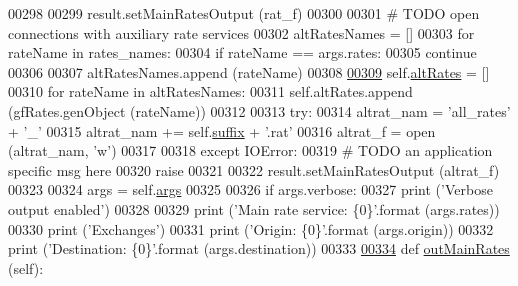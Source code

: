 \begin{DoxyCode}
{00298 
00299         result.setMainRatesOutput (rat\_f)
00300             
00301         \textcolor{comment}{# TODO open connections with auxiliary rate services}
00302         altRatesNames = []        
00303         \textcolor{keywordflow}{for} rateName \textcolor{keywordflow}{in} rates\_names:
00304             \textcolor{keywordflow}{if} rateName == args.rates:
00305                 \textcolor{keywordflow}{continue} 
00306             
00307             altRatesNames.append (rateName)
00308 
\hypertarget{e2e_8py_source.tex_l00309}{}\hyperlink{classe2e_1_1_application_a92626ca2a674ccbba7f743b13c77fd7b}{00309}         self.\hyperlink{classe2e_1_1_application_a92626ca2a674ccbba7f743b13c77fd7b}{altRates} = []            
00310         \textcolor{keywordflow}{for} rateName \textcolor{keywordflow}{in} altRatesNames:
00311             self.altRates.append (gfRates.genObject (rateName))
00312             
00313         \textcolor{keywordflow}{try}:
00314             altrat\_nam  =  \textcolor{stringliteral}{'all\_rates'} + \textcolor{stringliteral}{'\_'}
00315             altrat\_nam +=  self.\hyperlink{classe2e_1_1_application_a4d824ad36b051d2d629edb314385df0d}{suffix} + \textcolor{stringliteral}{'.rat'}
00316             altrat\_f = open (altrat\_nam, \textcolor{stringliteral}{'w'})
00317             
00318         \textcolor{keywordflow}{except} IOError:
00319             \textcolor{comment}{# TODO an application specific msg here}
00320             \textcolor{keywordflow}{raise}        
00321 
00322         result.setMainRatesOutput (altrat\_f)
00323         
00324         args = self.\hyperlink{classe2e_1_1_application_abade6fc2e2c04ddd7e48137a2a7721bd}{args} 
00325                
00326         \textcolor{keywordflow}{if} args.verbose:            
00327             \textcolor{keywordflow}{print} (\textcolor{stringliteral}{'Verbose output enabled'})
00328             
00329             \textcolor{keywordflow}{print} (\textcolor{stringliteral}{'Main rate service: \{0\}'}.format (args.rates))
00330             \textcolor{keywordflow}{print} (\textcolor{stringliteral}{'Exchanges'})
00331             \textcolor{keywordflow}{print} (\textcolor{stringliteral}{'Origin:            \{0\}'}.format (args.origin))
00332             \textcolor{keywordflow}{print} (\textcolor{stringliteral}{'Destination:       \{0\}'}.format (args.destination))
00333             
\hypertarget{e2e_8py_source.tex_l00334}{}\hyperlink{classe2e_1_1_application_a3e33fd00d85637393d48ea3f7dbd95c7}{00334}     \textcolor{keyword}{def }\hyperlink{classe2e_1_1_application_a3e33fd00d85637393d48ea3f7dbd95c7}{outMainRates} (self):
}
\end{DoxyCode}
